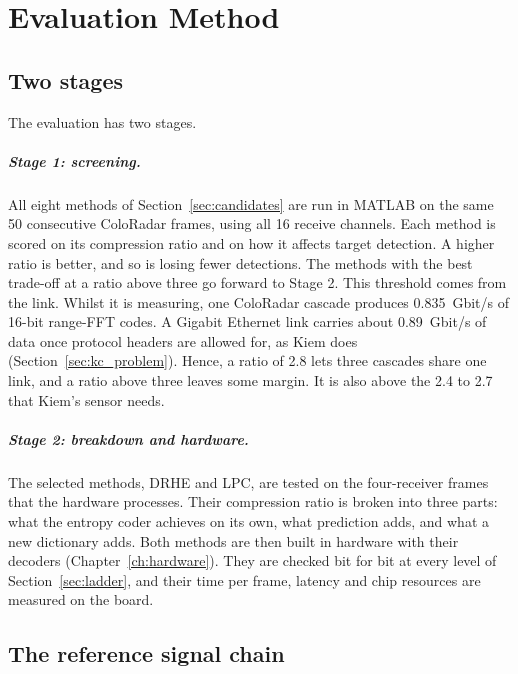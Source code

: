 \chapter{Evaluation Method}
\label{ch:evaluation}

\section{Two stages}
\label{sec:stages}

The evaluation has two stages.

\paragraph{Stage 1: screening.}
All eight methods of Section~\ref{sec:candidates} are run in MATLAB on the same
50 consecutive ColoRadar frames, using all 16 receive channels. Each method is
scored on its compression ratio and on how it affects target detection. A
higher ratio is better, and so is losing fewer detections. The methods with the
best trade-off at a ratio above three go forward to Stage 2.\label{sec:linkreq}
This threshold comes from the link. Whilst it is measuring, one ColoRadar
cascade produces \SI{0.835}{Gbit/s} of 16-bit range-FFT codes. A Gigabit
Ethernet link carries about \SI{0.89}{Gbit/s} of data once protocol headers are
allowed for, as Kiem does (Section~\ref{sec:kc_problem}). Hence, a ratio of 2.8
lets three cascades share one link, and a ratio above three leaves some margin.
It is also above the \num{2.4} to \num{2.7} that Kiem's sensor needs.

\paragraph{Stage 2: breakdown and hardware.}
The selected methods, DRHE and LPC, are tested on the four-receiver frames that
the hardware processes. Their compression ratio is broken into three parts:
what the entropy coder achieves on its own, what prediction adds, and what a
new dictionary adds. Both methods are then built in hardware with their
decoders (Chapter~\ref{ch:hardware}). They are checked bit for bit at every
level of Section~\ref{sec:ladder}, and their time per frame, latency and chip
resources are measured on the board.

\section{The reference signal chain}
\label{sec:refchain}

